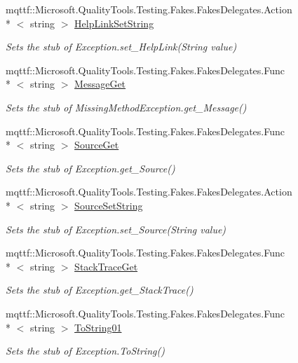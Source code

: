 \begin{DoxyCompactItemize}
mqttf\-::\-Microsoft.\-Quality\-Tools.\-Testing.\-Fakes.\-Fakes\-Delegates.\-Action\\*
$<$ string $>$ \hyperlink{class_system_1_1_fakes_1_1_stub_missing_method_exception_ac32da577a544d47a120d62ff71f89f53}{Help\-Link\-Set\-String}
\begin{DoxyCompactList}\small\item\em Sets the stub of Exception.\-set\-\_\-\-Help\-Link(\-String value)\end{DoxyCompactList}\item 
mqttf\-::\-Microsoft.\-Quality\-Tools.\-Testing.\-Fakes.\-Fakes\-Delegates.\-Func\\*
$<$ string $>$ \hyperlink{class_system_1_1_fakes_1_1_stub_missing_method_exception_aa6fa9e4136f1e69a9a823f84a199c7f9}{Message\-Get}
\begin{DoxyCompactList}\small\item\em Sets the stub of Missing\-Method\-Exception.\-get\-\_\-\-Message()\end{DoxyCompactList}\item 
mqttf\-::\-Microsoft.\-Quality\-Tools.\-Testing.\-Fakes.\-Fakes\-Delegates.\-Func\\*
$<$ string $>$ \hyperlink{class_system_1_1_fakes_1_1_stub_missing_method_exception_a508040e6d946819498026aaa943a9301}{Source\-Get}
\begin{DoxyCompactList}\small\item\em Sets the stub of Exception.\-get\-\_\-\-Source()\end{DoxyCompactList}\item 
mqttf\-::\-Microsoft.\-Quality\-Tools.\-Testing.\-Fakes.\-Fakes\-Delegates.\-Action\\*
$<$ string $>$ \hyperlink{class_system_1_1_fakes_1_1_stub_missing_method_exception_a782a6cbe3e83e361a116d4f0d1d546bc}{Source\-Set\-String}
\begin{DoxyCompactList}\small\item\em Sets the stub of Exception.\-set\-\_\-\-Source(\-String value)\end{DoxyCompactList}\item 
mqttf\-::\-Microsoft.\-Quality\-Tools.\-Testing.\-Fakes.\-Fakes\-Delegates.\-Func\\*
$<$ string $>$ \hyperlink{class_system_1_1_fakes_1_1_stub_missing_method_exception_afeec03052788d3d9a9222d9a19785103}{Stack\-Trace\-Get}
\begin{DoxyCompactList}\small\item\em Sets the stub of Exception.\-get\-\_\-\-Stack\-Trace()\end{DoxyCompactList}\item 
mqttf\-::\-Microsoft.\-Quality\-Tools.\-Testing.\-Fakes.\-Fakes\-Delegates.\-Func\\*
$<$ string $>$ \hyperlink{class_system_1_1_fakes_1_1_stub_missing_method_exception_a6ce324d5c5bec02f0f6ba47343868346}{To\-String01}
\begin{DoxyCompactList}\small\item\em Sets the stub of Exception.\-To\-String()\end{DoxyCompactList}\end{DoxyCompactItemize}
